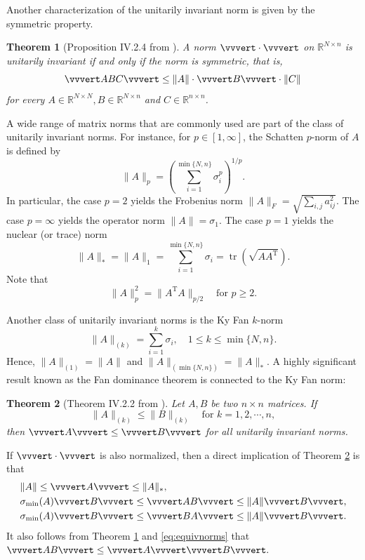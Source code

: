 \documentclass[reqno]{amsart}
\DeclareMathOperator{\tr}{tr}
\newcommand{\T}{\mathrm{T}}
\theoremstyle{plain}
\newtheorem{theorem}{Theorem}
\theoremstyle{definition}
\begin{document}
Another characterization of the unitarily invariant norm is given by the symmetric property. 
\begin{theorem}[Proposition IV.2.4 from \cite{Bhatia}]\label{thm:char1}
A norm $\vvvert \cdot \vvvert $ on $\mathbb{R}^{N \times n}$ is unitarily invariant if and only if the norm is symmetric, that is, 
$$\vvvert ABC \vvvert \le \|A\| \cdot \vvvert B \vvvert \cdot \|C\|$$ 
for every $A \in \mathbb{R}^{N \times N}, B \in \mathbb{R}^{N \times n}$ and $C \in \mathbb{R}^{n \times n}$.
\end{theorem}

A wide range of matrix norms that are commonly used are part of the class of unitarily invariant norms. For instance, for $p\in [1, \infty]$, the Schatten $p$-norm of $A$ is defined by $$\|A\|_p = \left( \sum_{i=1}^{\min\{N,n\}} \sigma_i^p \right)^{1/p}.$$ In particular, the case $p = 2$ yields the Frobenius norm $\|A\|_F=\sqrt{\sum_{i,j} a_{ij}^2}$. The case $p=\infty$ yields the operator norm $\|A\|=\sigma_1$. The case $p=1$ yields the nuclear (or trace) norm $$\|A\|_* =\|A\|_1= \sum_{i=1}^{\min\{N,n\}}  \sigma_i = \tr\left(\sqrt{A A^\T} \right).$$ Note that
\begin{equation}\label{eq:sp}
\|A\|_p^2 = \|A^\T A \|_{p/2} \quad\text{for } p \ge 2.
\end{equation}

Another class of unitarily invariant norms is the Ky Fan $k$-norm $$\|A\|_{(k)} = \sum_{i=1}^k \sigma_i,\quad 1\le k \le \min\{N,n\}.$$  Hence, $\|A\|_{(1)} = \|A\|$ and $\|A\|_{(\min\{N,n\})} = \|A\|_*$. A highly significant result known as the Fan dominance theorem is connected to the Ky Fan norm: 
\begin{theorem}[Theorem IV.2.2 from \cite{Bhatia}]\label{thm:fan}
Let $A,B$ be two $n\times n$ matrices. If $$\|A\|_{(k)} \le \|B\|_{(k)}\quad \text{for } k=1,2,\cdots, n,$$ then $\vvvert A\vvvert \le \vvvert B\vvvert$ for all unitarily invariant norms. 
\end{theorem}
If $\vvvert \cdot \vvvert$ is also normalized, then a direct implication of Theorem \ref{thm:fan} is that
\begin{align}
&\|A\| \le \vvvert A\vvvert \le \|A\|_*, \label{eq:equivnorms}\\
&\sigma_{\min}(A) \vvvert B\vvvert \le \vvvert AB\vvvert \le \|A\| \vvvert B\vvvert,\nonumber\\
&\sigma_{\min}(A) \vvvert B\vvvert \le \vvvert BA\vvvert \le \|A\| \vvvert B\vvvert.\nonumber
\end{align}
It also follows from Theorem \ref{thm:char1} and \eqref{eq:equivnorms} that $\vvvert AB\vvvert \le \vvvert A\vvvert \vvvert B\vvvert.$
\end{document}
